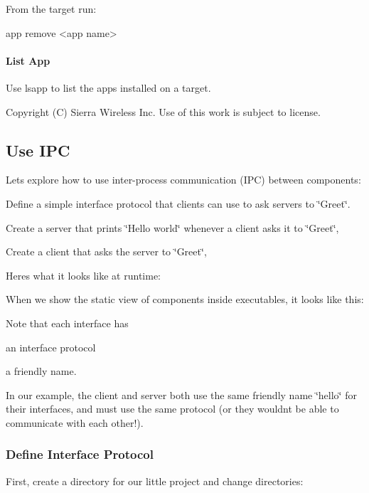 From the target run\+: \begin{DoxyVerb}app remove <app name>
\end{DoxyVerb}
\hypertarget{basic_apps_create_basicAppsCreate_usageLsApp}{}\paragraph{List App}\label{basic_apps_create_basicAppsCreate_usageLsApp}
Use {\ttfamily lsapp} to list the apps installed on a target.







Copyright (C) Sierra Wireless Inc. Use of this work is subject to license. \hypertarget{basicAppsIPC}{}\subsection{Use I\+P\+C}\label{basicAppsIPC}
Lets explore how to use inter-\/process communication (I\+P\+C) between components\+:


\begin{DoxyItemize}
\item Define a simple interface protocol that clients can use to ask servers to \char`\"{}\+Greet\char`\"{}.
\item Create a server that prints \char`\"{}\+Hello world\char`\"{} whenever a client asks it to \char`\"{}\+Greet\char`\"{},
\item Create a client that asks the server to \char`\"{}\+Greet\char`\"{},
\end{DoxyItemize}

Here\textquotesingle{}s what it looks like at runtime\+:



When we show the static view of components inside executables, it looks like this\+:



Note that each interface has
\begin{DoxyItemize}
\item an interface protocol
\item a friendly name.
\end{DoxyItemize}

In our example, the client and server both use the same friendly name \char`\"{}hello\char`\"{} for their interfaces, and must use the same protocol (or they wouldn\textquotesingle{}t be able to communicate with each other!).\hypertarget{basic_apps_i_p_c_helloIPCDefiningTheAPI}{}\subsubsection{Define Interface Protocol}\label{basic_apps_i_p_c_helloIPCDefiningTheAPI}
First, create a directory for our little project and change directories\+:

